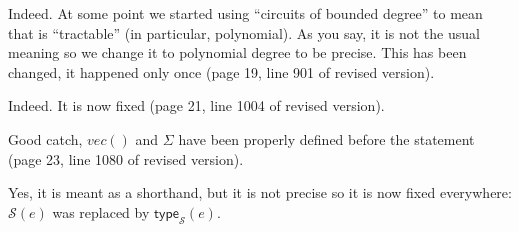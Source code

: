 \begin{comment}
	In different parts of the paper you say ``circuits of bounded degree''. In my view, this usually means that there exists a *constant* that bounds the degree of all circuits in the family, but it is not what you are considering here.
\end{comment}

\answer Indeed. At some point we started using ``circuits of bounded degree'' to mean that is ``tractable'' (in particular, polynomial). As you say, it is not the usual meaning so we change it to polynomial degree to be precise.
This has been changed, it happened only once (page 19, line 901 of revised version).
\bigskip

\begin{comment}
	Line 22 of Algorithm 1: in the comment I guess meant that $getinput(g)$ outputs $i$, and not $A[i]$.
\end{comment}

\answer Indeed. It is now fixed (page 21, line 1004 of revised version).
\bigskip

\begin{comment}
	Proposition 5.2 is very long, as it is defining notation in place. I would defined the required notation, such as $vec()$, first, and then give the claim. Moreover, you use $\Sigma$, which has never been defined. Do you mean $\{0,1\}$?
\end{comment}

\answer Good catch, $vec()$ and $\Sigma$ have been properly defined before the statement (page 23, line 1080 of revised version).
\bigskip

\begin{comment}
	Proposition 6.3: wherever you use $S(e)$, I guess you mean $type(e)$.
\end{comment}

\answer Yes, it is meant as a shorthand, but it is not precise so it is now fixed everywhere: $\mathcal{S}(e)$ was replaced by $\mathsf{type}_\mathcal{S}(e)$.
\bigskip

\begin{comment}
	Figure 4 is again somehow misleading, as you do not prove equivalence with those formalisms in general, but you assume e.g., bounded depth/polynomial degree, binary relations, etc. Please introduce proper notation for these restricted fragments. You could explain this notation in the caption of the figure.
\end{comment}

\answer \TODO
{}
\bigskip
